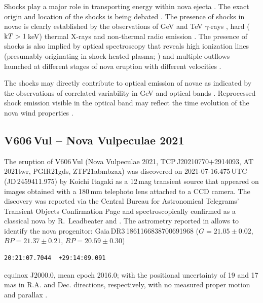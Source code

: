\documentclass[twocolumn]{aastex631}
\newcommand{\nova}{V606\,Vul}
\begin{document}
Shocks play a major role in transporting energy within nova ejecta \citep{2021ARA&A..59..391C}. 
The exact origin and location of the shocks is being debated \citep{2022ApJ...938...31S,2022ApJ...939....1H}.
The presence of shocks in novae is clearly established by the observations 
of GeV \citep{2010Sci...329..817A,2014Sci...345..554A,2018A&A...609A.120F} and
TeV $\gamma$-rays \citep{2016MNRAS.457.1786M,2022NatAs...6..689A,2022Sci...376...77H}, 
hard (${\rm k} T > 1$\,keV) thermal X-rays 
\citep{2019ApJ...872...86N,2020MNRAS.497.2569S,2021ApJ...910..134G,2022MNRAS.514.2239S}
and non-thermal radio emission
\citep{2020A&A...638A.130G,2021ApJS..257...49C,2022A&A...666L...6M,2023arXiv230203043S}.
The presence of shocks is also implied by optical spectroscopy that reveals
high ionization lines (presumably originating in shock-heated plasma;
\citealt{1972SvA....16...32G,1978ApJ...225..950S,1997ApJ...475..803C}) and
multiple outflows launched at different stages of nova eruption with
different velocities \citep[that should collide producing shocks;][]{2020ApJ...905...62A,Steinberg&Metzger20}.

The shocks may directly contribute to optical emission of novae \citep{Metzger+14} as indicated
by the observations of correlated variability in GeV and optical bands
\citep{2017NatAs...1..697L,2020NatAs...4..776A}.
Reprocessed shock emission visible in the optical band may reflect 
the time evolution of the nova wind properties \citep{2018A&A...612A..38M}.


\subsection{\nova{} -- Nova Vulpeculae 2021}
\label{sec:thisnova}

The eruption of \nova{} (Nova Vulpeculae 2021, TCP\,J20210770$+$2914093, AT\,2021twr, PGIR21gds, ZTF21abmbzax) 
was discovered on 
2021-07-16.475\,UTC (JD\,2459411.975)
by Koichi Itagaki as a 12\,mag
transient source that appeared on images obtained with a 180\,mm telephoto lens attached to a CCD camera. 
The discovery was reported via the Central Bureau for Astronomical Telegrams' Transient Objects Confirmation Page
and spectroscopically confirmed as a classical nova by 
R.~Leadbeater \citep{2021CBET.5007....1I} and \citep{2021ATel14793....1M,2021ATel14816....1M}.
The astrometry reported in \cite{2021CBET.5007....1I} allows to identify the nova progenitor: Gaia\,DR3\,1861166838700691968 
($G = 21.05 \pm 0.02$, $BP = 21.37 \pm 0.21$, $RP = 20.59 \pm 0.30$)
\begin{verbatim}
20:21:07.7044  +29:14:09.091
\end{verbatim}
equinox J2000.0, mean epoch 2016.0;
with the positional uncertainty of 19 and 17\,mas 
in R.A. and Dec. directions, respectively, 
with no measured proper motion and parallax \citep{2016A&A...595A...1G,2022arXiv220800211G}.
\end{document}
